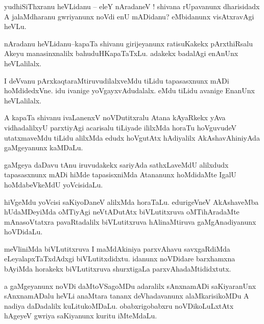 \documentclass{article}
\begin{document}

\begin{mn}%
yudhiSiThxranu heVLidanu -- eleY nAradaneV ! shivana rUpavanunx dharisidadx A jalaMdharanu 
gwriyanunx noVdi enU mADidanu? eMbidanunx visAtxravAgi heVLu.
\end{mn}

\begin{mn}%
nAradanu heVLidanu--kapaTa shivanu girijeyanunx ratisuKakekx pArxthiRsalu Akeyu 
manasinxnalilx bahuduHKapaTaTxLu. adakekx badalAgi enAnUnx heVLalilalx.
\end{mn}

\begin{mn}%
I deVvanu pArxkaqtaraMtiruvudilalxveMdu tiLidu tapasasxnunx mADi hoMdidedxVne. idu ivanige 
yoVgayxvAdudalalx. eMdu tiLidu avanige EnanUnx heVLalilalx.
\end{mn}

\begin{mn}%
A kapaTa shivanu ivaLanenxV noVDutitxralu Atana kAyaRkekx yAva vidhadalilxyU parxtiyAgi 
acarisalu tiLiyade ililxMda horaTu hoVguvudeV utatxmaveMdu tiLidu alilxMda edudx hoVgutAtx 
hAdiyalilx AkAshavAhiniyAda gaMgeyanunx kaMDaLu. 
\end{mn}

\begin{mn}%
gaMgeya daDavu tAnu iruvudakekx sariyAda sathxLaveMdU alilxdudx tapasasxnunx mADi hiMde 
tapasisxniMda Atananunx hoMdidaMte IgalU hoMdabeVkeMdU yoVcisidaLu.
\end{mn}

\begin{mn}%
hiVgeMdu yoVcisi saKiyoDaneV alilxMda horaTaLu. edurigeVneV AkAshaveMba hUdaMDeyiMda 
oMTiyAgi neVtADutAtx biVLutitxruva oMTihAradaMte mAnasoVtatxra pavaRtadalilx biVLutitxruva 
hAlinaMtiruva gaMgAnadiyanunx hoVDidaLu.
\end{mn}

\begin{mn}%
meVliniMda biVLutitxruva I maMdAkiniya parxvAhavu savxgaRdiMda eLeyalapxTaTxdAdxgi 
biVLutitxdidxtu. idanunx noVDidare barxhamxna bAyiMda horakekx biVLutitxruva shurxtigaLa 
parxvAhadaMtididxtutx.
\end{mn}

\begin{mn}%
a gaMgeyanunx noVDi daMtoVSagoMDu adaralilx sAnxnamADi saKiyaranUnx sAnxnamADalu heVLi 
anaMtara tananx deVhadavanunx alaMkarisikoMDu A nadiya daDadalilx kuLitukoMDaLu. 
obabxrigobabxru noVDikoLuLxtAtx hAgeyeV gwriya saKiyanunx kuritu iMteMdaLu.
\end{mn}
\end{document}
